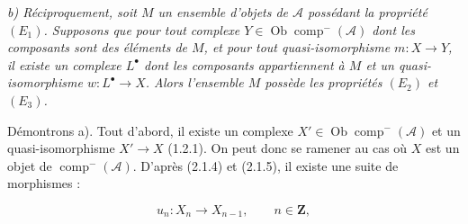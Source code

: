 \noindent\textit{b) Réciproquement, soit $M$ un ensemble d'objets de
$\mathcal A$ possédant la propriété $(E_1)$. Supposons que pour tout
complexe $Y\in\operatorname{Ob}\operatorname{comp}^{-}(\mathcal A)$ dont
les composants sont des éléments de $M$, et pour tout quasi-isomorphisme
$m\colon X\longrightarrow Y$, il existe un complexe $L^\bullet$ dont les
composants appartiennent à $M$ et un quasi-isomorphisme
$w\colon L^\bullet\longrightarrow X$. Alors l'ensemble $M$ possède les
propriétés $(E_2)$ et $(E_3)$.}

Démontrons a). Tout d'abord, il existe un complexe
$X'\in\operatorname{Ob}\operatorname{comp}^{-}(\mathcal A)$ et un
quasi-isomorphisme $X'\longrightarrow X$ (1.2.1). On peut donc se ramener
au cas où $X$ est un objet de $\operatorname{comp}^{-}(\mathcal A)$.
D'après (2.1.4) et (2.1.5), il existe une suite de morphismes :

\[
u_n\colon X_n\longrightarrow X_{n-1},
\qquad n\in\mathbf Z,
\]
\endgroup
